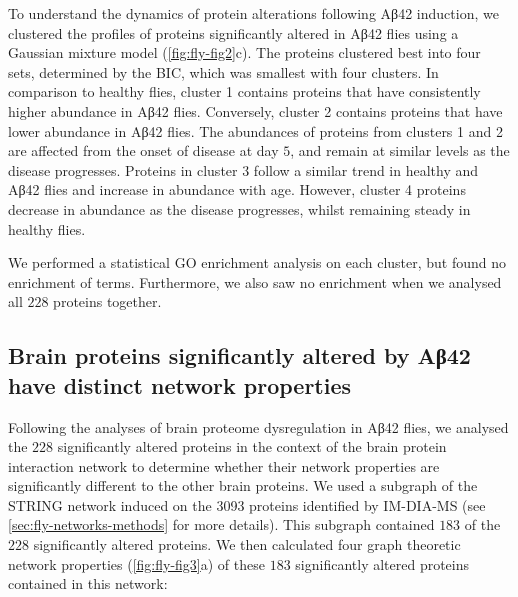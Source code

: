 To understand the dynamics of protein alterations following Aβ42 induction,
we clustered the profiles of proteins significantly altered in Aβ42 flies using
a Gaussian mixture model (\ref{fig:fly-fig2}c).
The proteins clustered best into four sets, determined by the BIC,
which was smallest with four clusters.
In comparison to healthy flies, cluster 1 contains proteins that have
consistently higher abundance in Aβ42 flies.
Conversely, cluster 2 contains proteins that have lower abundance in Aβ42 flies.
The abundances of proteins from clusters 1 and 2 are affected from the onset
of disease at day $5$, and remain at similar levels as the disease progresses.
Proteins in cluster $3$ follow a similar trend in healthy and Aβ42 flies
and increase in abundance with age.
However, cluster 4 proteins decrease in abundance as the disease progresses,
whilst remaining steady in healthy flies.


We performed a statistical GO enrichment analysis on each cluster,
but found no enrichment of terms.
Furthermore, we also saw no enrichment when we analysed all $228$ proteins together.

\subsection{Brain proteins significantly altered by Aβ42 have distinct network properties}

Following the analyses of brain proteome dysregulation in Aβ42 flies,
we analysed the $228$ significantly altered proteins in the context of the
brain protein interaction network to determine whether their network properties
are significantly different to the other brain proteins.
We used a subgraph of the STRING \cite{Szklarczyk2015} network
induced on the \num{3093} proteins identified by IM-DIA-MS
(see \ref{sec:fly-networks-methods} for more details).
This subgraph contained $183$ of the $228$ significantly altered proteins.
We then calculated four graph theoretic network properties (\ref{fig:fly-fig3}a)
of these $183$ significantly altered proteins contained in this network:

